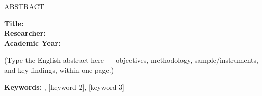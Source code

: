 \begin{center}
{\hOneSize ABSTRACT}
\end{center}
\vspace{6pt}

\noindent\textbf{Title:} \\
\textbf{Researcher:} \\
\textbf{Academic Year:} \quad [B.E. ....]

\vspace{12pt}
\setlength{\parindent}{1.25cm}\indent
(Type the English abstract here — objectives, methodology, sample/instruments,
and key findings, within one page.)

\vspace{12pt}
\noindent\textbf{Keywords:} \quad [keyword 1], [keyword 2], [keyword 3]
